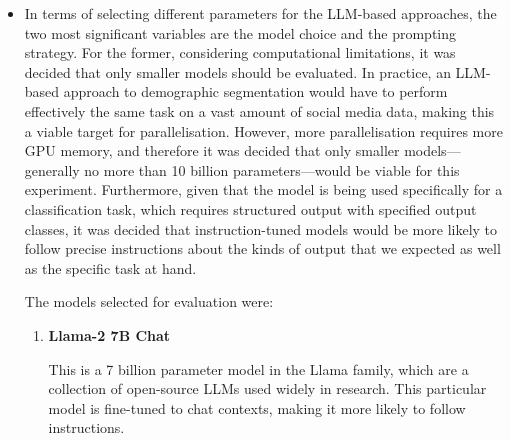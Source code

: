 \documentclass{report}
\begin{document}
\begin{itemize}
\begin{enumerate}
\item \textbf{Logistic Regression}

For both age and gender, setting of \texttt{C} was 1. For age prediction, TF-IDF yielded better results, whereas Bag of Words performed better for gender prediction.

\item \textbf{Support Vector Classification}

The optimal setting of \texttt{C} was 0.1 for both age and gender, and in both cases, TF-IDF performed better.

\item \textbf{Random Forest Classification}

For both age and gender, the optimal setting of \texttt{n\_estimators} was 500 and \texttt{max\_depth} was 30. For age prediction, Bag of Words yielded better results, but TF-IDF performed better for gender prediction.
\end{enumerate}

\item In terms of selecting different parameters for the LLM-based approaches, the two most significant variables are the model choice and the prompting strategy. For the former, considering computational limitations, it was decided that only smaller models should be evaluated. In practice, an LLM-based approach to demographic segmentation would have to perform effectively the same task on a vast amount of social media data, making this a viable target for parallelisation. However, more parallelisation requires more GPU memory, and therefore it was decided that only smaller models—generally no more than 10 billion parameters—would be viable for this experiment. Furthermore, given that the model is being used specifically for a classification task, which requires structured output with specified output classes, it was decided that instruction-tuned models would be more likely to follow precise instructions about the kinds of output that we expected as well as the specific task at hand.

The models selected for evaluation were:

\begin{enumerate}
\item \textbf{Llama-2 7B Chat}

This is a 7 billion parameter model in the Llama family, which are a collection of open-source LLMs used widely in research. This particular model is fine-tuned to chat contexts, making it more likely to follow instructions.


\end{enumerate}
\end{itemize}
\end{document}
